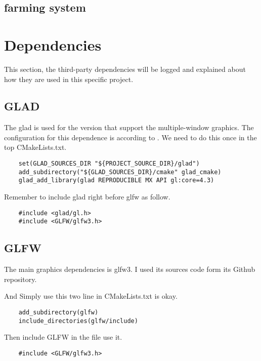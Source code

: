 \documentclass{article}
\theoremstyle{definition} %
\begin{document}
\subsection[farming]{farming system}

\section[deps]{Dependencies}
This section, the third-party dependencies
will be logged and explained about how they
are used in this specific project.
\subsection[GLAD]{GLAD}
The glad is used for the version that support
the multiple-window graphics. The configuration
for this dependence is according to
\cite[gladMultiwinMx]{GLAD_multiwin_mx}. We
need to do this once in the top CMakeLists.txt.

\begin{verbatim}
    set(GLAD_SOURCES_DIR "${PROJECT_SOURCE_DIR}/glad")
    add_subdirectory("${GLAD_SOURCES_DIR}/cmake" glad_cmake)
    glad_add_library(glad REPRODUCIBLE MX API gl:core=4.3)
\end{verbatim}

Remember to include glad right before glfw as
follow.

\begin{verbatim}
    #include <glad/gl.h>
    #include <GLFW/glfw3.h>
\end{verbatim}

\subsection[GLFW]{GLFW}
The main graphics dependencies is glfw3.
I used its sources code form its Github
repository.

And Simply use this two line in CMakeLists.txt
is okay.

\begin{verbatim}
    add_subdirectory(glfw)
    include_directories(glfw/include)
\end{verbatim}

Then include GLFW in the file use it.

\begin{verbatim}
    #include <GLFW/glfw3.h>
\end{verbatim}
\end{document}
